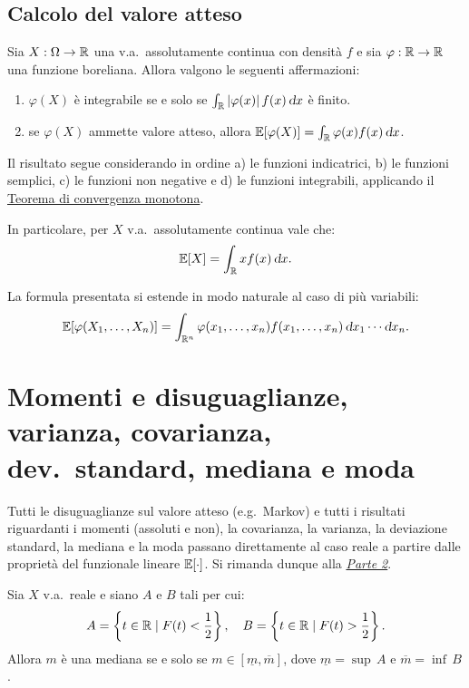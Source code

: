 \begin{multicols*}{2}
\subsection{Calcolo del valore atteso}

\begin{proposition}
    Sia $X : \Omega \to \mathbb{R}$ una v.a.~assolutamente continua con densità $f$
    e sia $\varphi : \mathbb{R} \to \mathbb{R}$ una funzione
    boreliana. Allora valgono le seguenti affermazioni:
    \begin{enumerate}[(i.)]
        \item $\varphi(X)$ è integrabile se e solo se $\int_\RR \abs{\varphi(x)} f(x) \dx$ è finito.
        \item se $\varphi(X)$ ammette valore atteso, allora $\EE[\varphi(X)] = \int_\RR \varphi(x) f(x) \dx$.
    \end{enumerate}
    Il risultato segue considerando in ordine a) le funzioni indicatrici, b) le funzioni semplici,
    c) le funzioni non negative e d) le funzioni integrabili, applicando il
    \hyperref[th:convergenza_monotona]{Teorema di convergenza monotona}. 
\end{proposition}

\begin{remark}
    In particolare, per $X$ v.a.~assolutamente continua vale che:
    \[
        \EE[X] = \int_\RR x f(x) \dx.
    \]
\end{remark}

\begin{remark}
    La formula presentata si estende in modo naturale al caso di più variabili:
    \[
        \EE[\varphi(X_1, \ldots, X_n)] = \int_{\RR^n} \varphi(x_1, \ldots, x_n) f(x_1, \ldots, x_n) \dx_1 \cdots \dx_n.
    \]
\end{remark}

\section{Momenti e disuguaglianze, varianza, covarianza, dev.~standard, mediana e moda}

Tutti le disuguaglianze sul valore atteso (e.g.~Markov) e tutti i risultati
riguardanti i momenti (assoluti e non), la covarianza, la varianza, la
deviazione standard, la mediana e la moda passano direttamente al
caso reale a partire dalle proprietà del funzionale lineare
$\mathbb{E}[\cdot]$. Si rimanda dunque alla \hyperref[sec:momenti_assoluti]{\textit{Parte 2}}.

\begin{proposition}
    Sia $X$ v.a.~reale e siano $A$ e $B$ tali per cui:
    \[
        A = \left\{t \in \mathbb{R} \mid F(t) < \frac{1}{2} \right\}, \quad B = \left\{t \in \mathbb{R} \mid F(t) > \frac{1}{2} \right\}.
    \]
    Allora $m$ è una mediana se e solo se $m \in [\underline{m}, \overline{m}]$, dove $\underline{m} = \sup \, A$ e
    $\overline{m} = \inf \, B$. \smallskip


\end{proposition}
\end{multicols*}
